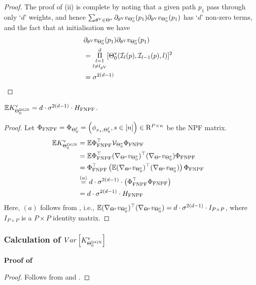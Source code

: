 \begin{appendix}
\begin{proof}
The proof of (ii) is complete by noting that a given path $p_1$ pass through only `$d$' weights, and hence $\sum_{{\theta^{\text{V}}}\in{\Theta}^{\text{v}}} \partial_{{\theta^{\text{V}}}}v_{{\Theta}^{\text{v}}_0}(p_1) \partial_{{\theta^{\text{V}}}}v_{{\Theta}^{\text{v}}_0}(p_1)$ has `$d$' non-zero terms, and the fact that at initialisation we have 
\begin{align*}
&\partial_{{\theta^{\text{V}}}}v_{{\Theta}^{\text{v}}_0}(p_1) \partial_{{\theta^{\text{V}}}}v_{{\Theta}^{\text{v}}_0}(p_1) \\
&=\underset{l\neq l_{{\theta^{\text{V}}}}}{\underset{l=1}{\overset{d}{\Pi}}} [{\Theta}^{\text{v}}_0(\mathcal{I}_{l}(p),\mathcal{I}_{l-1}(p),l)]^2\\
&=\sigma^{2(d-1)}
\end{align*}
\end{proof}



\begin{theorem}\label{th:exp}
 $\mathbb{E}{K^{\text{v}}_{\Theta^{\text{DGN}}_0}}=d\cdot\sigma^{2(d-1)} \cdot H_{\text{FNPF}}$. 
\end{theorem}
\begin{proof}
Let $\Phi_{\text{FNPF}}=\Phi_{\Theta^{\textrm{f}}_0}=\left(\phi_{x_s,\Theta^{\textrm{f}}_0}, s\in[n]\right)\in\mathrm{R}^{P\times n}$ be the NPF matrix. 
\begin{align*}
\mathbb{E}{K^{\text{v}}_{\Theta^{\text{DGN}}_0}}&=\mathbb{E}{\Phi^\top_{\text{FNPF}} \mathcal{V}_{{\Theta}^{\text{v}}_0} \Phi_{\text{FNPF}}}\\
&=\mathbb{E}{\Phi^\top_{\text{FNPF}} (\nabla_{{\Theta}^{\text{v}}}v_{{\Theta}^{\text{v}}_0})^\top (\nabla_{{\Theta}^{\text{v}}}v_{{\Theta}^{\text{v}}_0}) \Phi_{\text{FNPF}}}\\
&=\Phi^\top_{\text{FNPF}}\left( \mathbb{E}{(\nabla_{{\Theta}^{\text{v}}}v_{{\Theta}^{\text{v}}_0})^\top (\nabla_{{\Theta}^{\text{v}}}v_{{\Theta}^{\text{v}}_0})}\right)\Phi_{\text{FNPF}}\\
&\stackrel{(a)}=d\cdot\sigma^{2(d-1)} \cdot\left(\Phi^\top_{\text{FNPF}}\Phi_{\text{FNPF}}\right)\\
&=d\cdot\sigma^{2(d-1)} \cdot H_{\text{FNPF}}
\end{align*}
Here, $(a)$ follows from  , i.e., $\mathbb{E}{(\nabla_{{\Theta}^{\text{v}}}v_{{\Theta}^{\text{v}}_0})^\top (\nabla_{{\Theta}^{\text{v}}}v_{{\Theta}^{\text{v}}_0})}= d\cdot\sigma^{2(d-1)}\cdot I_{P\times P}$, where $I_{P\times P}$ is a ${P\times P}$ identity matrix.
\end{proof}

\subsubsection{Calculation of $Var\left[K^\text{v}_{\Theta^{\text{DGN}}_0}\right]$}



\textbf{Proof of}
\begin{proof} Follows from  and .
\end{proof}



\end{appendix}
